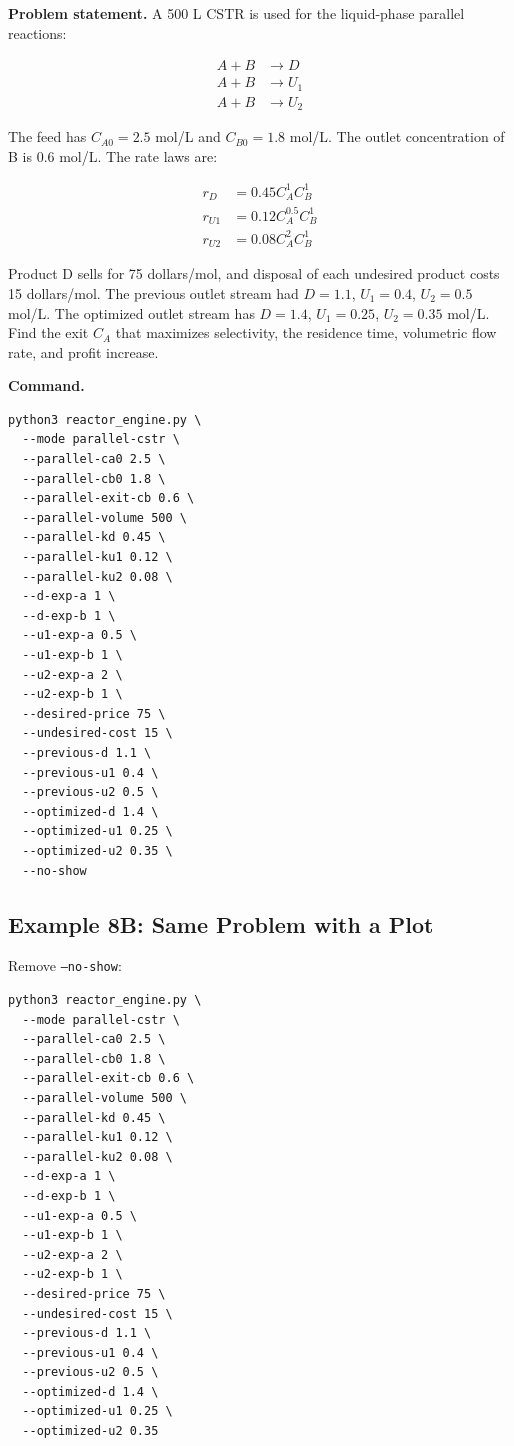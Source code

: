 \documentclass[11pt]{article}
\begin{document}
\textbf{Problem statement.} A 500 L CSTR is used for the liquid-phase parallel reactions:

\begin{align*}
A+B &\to D \\
A+B &\to U_1 \\
A+B &\to U_2
\end{align*}

The feed has $C_{A0}=2.5$ mol/L and $C_{B0}=1.8$ mol/L. The outlet concentration of B is 0.6 mol/L. The rate laws are:

\begin{align*}
r_D &= 0.45C_A^1C_B^1 \\
r_{U1} &= 0.12C_A^{0.5}C_B^1 \\
r_{U2} &= 0.08C_A^2C_B^1
\end{align*}

Product D sells for 75 dollars/mol, and disposal of each undesired product costs 15 dollars/mol. The previous outlet stream had $D=1.1$, $U_1=0.4$, $U_2=0.5$ mol/L. The optimized outlet stream has $D=1.4$, $U_1=0.25$, $U_2=0.35$ mol/L. Find the exit $C_A$ that maximizes selectivity, the residence time, volumetric flow rate, and profit increase.

\textbf{Command.}

\begin{lstlisting}
python3 reactor_engine.py \
  --mode parallel-cstr \
  --parallel-ca0 2.5 \
  --parallel-cb0 1.8 \
  --parallel-exit-cb 0.6 \
  --parallel-volume 500 \
  --parallel-kd 0.45 \
  --parallel-ku1 0.12 \
  --parallel-ku2 0.08 \
  --d-exp-a 1 \
  --d-exp-b 1 \
  --u1-exp-a 0.5 \
  --u1-exp-b 1 \
  --u2-exp-a 2 \
  --u2-exp-b 1 \
  --desired-price 75 \
  --undesired-cost 15 \
  --previous-d 1.1 \
  --previous-u1 0.4 \
  --previous-u2 0.5 \
  --optimized-d 1.4 \
  --optimized-u1 0.25 \
  --optimized-u2 0.35 \
  --no-show
\end{lstlisting}

\subsection{Example 8B: Same Problem with a Plot}

Remove \texttt{--no-show}:

\begin{lstlisting}
python3 reactor_engine.py \
  --mode parallel-cstr \
  --parallel-ca0 2.5 \
  --parallel-cb0 1.8 \
  --parallel-exit-cb 0.6 \
  --parallel-volume 500 \
  --parallel-kd 0.45 \
  --parallel-ku1 0.12 \
  --parallel-ku2 0.08 \
  --d-exp-a 1 \
  --d-exp-b 1 \
  --u1-exp-a 0.5 \
  --u1-exp-b 1 \
  --u2-exp-a 2 \
  --u2-exp-b 1 \
  --desired-price 75 \
  --undesired-cost 15 \
  --previous-d 1.1 \
  --previous-u1 0.4 \
  --previous-u2 0.5 \
  --optimized-d 1.4 \
  --optimized-u1 0.25 \
  --optimized-u2 0.35
\end{lstlisting}
\end{document}
